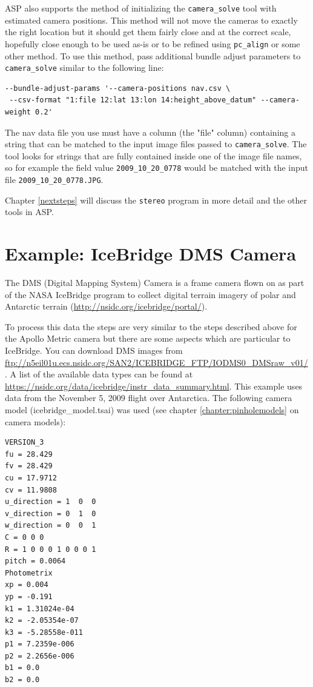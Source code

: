 ASP also supports the method of initializing the \texttt{camera\_solve} tool with estimated
camera positions.  This method will not move the cameras to exactly the right location but
it should get them fairly close and at the correct scale, hopefully close enough
to be used as-is or to be refined using \texttt{pc\_align} or some other method.
To use this method, pass additional bundle adjust parameters to \texttt{camera\_solve} similar to the following line:

\begin{verbatim}
--bundle-adjust-params '--camera-positions nav.csv \
 --csv-format "1:file 12:lat 13:lon 14:height_above_datum" --camera-weight 0.2'
\end{verbatim}

The nav data file you use must have a column (the "file" column) containing a string that can be matched to the
input image files passed to \texttt{camera\_solve}.  The tool looks for strings that are fully contained
inside one of the image file names, so for example the field value \texttt{2009\_10\_20\_0778} would be
matched with the input file \texttt{2009\_10\_20\_0778.JPG}.

Chapter \ref{nextsteps} will discuss the \texttt{stereo} program in more
detail and the other tools in ASP.

\section{Example: IceBridge DMS Camera}
\label{sfm:icebridge}


The DMS (Digital Mapping System) Camera is a frame camera flown on as part of the NASA
IceBridge program to collect digital terrain imagery of polar and Antarctic terrain
(\url{http://nsidc.org/icebridge/portal/}). 

To process this data the steps are very similar to the steps described
above for the Apollo Metric camera but there are some aspects which are
particular to IceBridge.  You can download DMS images from
\url{ftp://n5eil01u.ecs.nsidc.org/SAN2/ICEBRIDGE_FTP/IODMS0_DMSraw_v01/}.
A list of the available data types can be found at
\url{https://nsidc.org/data/icebridge/instr_data_summary.html}.  This
example uses data from the November 5, 2009 flight over Antarctica. The
following camera model (icebridge\_model.tsai) was used (see chapter
\ref{chapter:pinholemodels} on camera models):

\begin{verbatim}
VERSION_3
fu = 28.429
fv = 28.429
cu = 17.9712
cv = 11.9808
u_direction = 1  0  0
v_direction = 0  1  0
w_direction = 0  0  1
C = 0 0 0
R = 1 0 0 0 1 0 0 0 1
pitch = 0.0064
Photometrix
xp = 0.004
yp = -0.191
k1 = 1.31024e-04
k2 = -2.05354e-07
k3 = -5.28558e-011
p1 = 7.2359e-006
p2 = 2.2656e-006
b1 = 0.0
b2 = 0.0
\end{verbatim}

